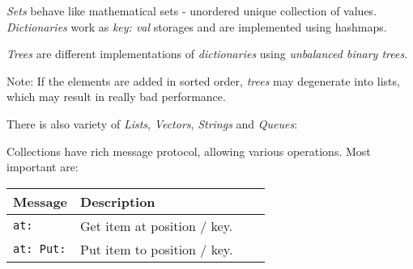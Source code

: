 \documentclass[10pt]{article}
\begin{document}
\begin{multicols*}{3}
\vspace*{0.4cm}
\textit{Sets} behave like mathematical sets - unordered unique collection of values. \textit{Dictionaries} work as \textit{key: val} storages and are implemented using hashmaps.

\textit{Trees} are different implementations of \textit{dictionaries} using \textit{unbalanced binary trees}.

Note: If the elements are added in sorted order, \textit{trees} may degenerate into lists, which may result in really bad performance.




\columnbreak

There is also variety of \textit{Lists}, \textit{Vectors}, \textit{Strings} and \textit{Queues}:

\vspace*{0.4cm}

\vspace*{0.4cm}

Collections have rich message protocol, allowing various operations. Most important are:


\vspace*{0.2cm}
\small{\begin{tabular}{ p{50pt} p{180pt} l l }
Message & Description
\\\hline\hline

\texttt{at:}
&
Get item at position / key.
\\\hline %

\texttt{at: Put:}
&
Put item to position / key.
\\\hline %


\end{tabular}}
\end{multicols*}
\end{document}
